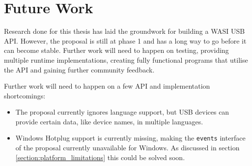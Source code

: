 \chapter{Future Work}
Research done for this thesis has laid the groundwork for building a \acrshort{WASI} \acrshort{USB} \acrshort{API}. However, the proposal is still at phase 1 and has a long way to go before it can become stable. Further work will need to happen on testing, providing multiple runtime implementations, creating fully functional programs that utilise the \acrshort{API} and gaining further community feedback.

Further work will need to happen on a few \acrshort{API} and implementation shortcomings:

\begin{itemize}
\item The proposal currently ignores language support, but \acrshort{USB} devices can provide certain data, like device names, in multiple languages.
\item Windows Hotplug support is currently missing, making the \texttt{events} interface of the proposal currently unavailable for Windows. As discussed in section \ref{section:platform_limitations} this could be solved soon.
\end{itemize}